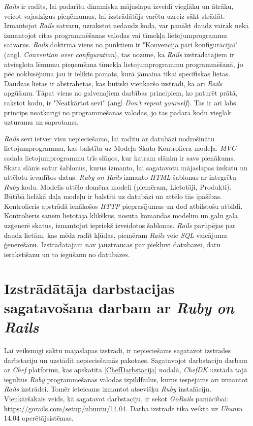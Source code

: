 \textit{Rails} ir radīts, lai padarītu dinamisku mājaslapu izveidi vieglāku un ātrāku, veicot vajadzīgus pieņēmumus, lai izstrādātājs varētu uzreiz sākt strādāt. Izmantojot \textit{Rails} satvaru, uzrakstot nedaudz koda, var panākt daudz vairāk nekā izmantojot citas programmēšanas valodas vai tīmekļa lietojumprogrammu satvarus. \textit{Rails} doktrīnā viens no punktiem ir "Konvencija pāri konfigurācijai" (angl. \textit{Convention over configuration}), tas nozīmē, ka \textit{Rails} izstrādātājiem ir atvieglota lēmumu pieņemšana tīmekļa lietojumprogrammu programmēšanā, jo pēc noklusējuma jau ir ielikts pamats, kurā jāmaina tikai specifiskas lietas. Daudzas lietas ir abstrahētas, kas būtiski vienkāršo izstrādi, kā arī \textit{Rails} apgūšanu. Tāpat viens no galvenajiem darbības principiem, ko paturēt prātā, rakstot kodu, ir "Neatkārtot sevi" (angl \textit{Don't repeat yourself}). Tas ir arī labs princips neatkarīgi no programmēšanas valodas, jo tas padara kodu vieglāk uzturamu un saprotamu.
\cite{hartlRails} \cite{rails-guides}

\textit{Rails} sevī ietver visu nepieciešamo, lai radītu ar datubāzi nodrošinātu lietojumprogrammu, kas balstīta uz Modeļa-Skata-Kontroliera  modeļa.
\textit{MVC} sadala lietojumprogrammu trīs slāņos, kur katram slānim ir savs pienākums.
Skata slānis satur šablonus, kurus izmanto, lai sagatavotu mājaslapas izskatu un attēlotu ievadītos datus. \textit{Ruby on Rails} izmanto \textit{HTML} šablonus ar integrētu \textit{Ruby} kodu.
Modelis attēlo domēna modeli (piemēram, Lietotāji, Produkti). Būtībā lielākā daļa modeļu ir balstīti uz datubāzi un attēlo tās īpašības.
Kontrolieris apstrādā ienākošos \textit{HTTP} pieprasījumus un dod atbilstošu atbildi. Kontrolieris saņem lietotāja klikšķus, nosūta komandas modelim un galu galā uzģenerē skatus, izmantojot iepriekš izveidotos šablonus.
\cite{rails-api}
\textit{Rails} parūpējas par daudz lietām, kas mēdz radīt kļūdas, piemēram \textit{Rails} veic \textit{SQL} vaicājumu ģenerēšanu. Izstrādātājam nav jāuztraucas par piekļuvi datubāzei, datu ierakstīšanu un to iegūšanu no datubāzes.

\section{Izstrādātāja darbstacijas sagatavošana darbam ar \textit{Ruby on Rails}} \label{RubyDarbstacija}
Lai veiksmīgi sāktu mājaslapas izstrādi, ir nepieciešams sagatavot izstrādes darbstaciju un uzstādīt nepieciešamās pakotnes. Sagatavojot darbstaciju darbam ar \textit{Chef} platformu, kas apskatīta \ref{ChefDarbstacija} nodaļā, \textit{ChefDK} uzstāda tajā iegultus \textit{Ruby} programmēšanas valodas izpildfailus, kurus iespējams arī izmantot \textit{Rails} izstrādei. Tomēr ieteicams izmantot atsevišķu \textit{Ruby} instalāciju. Vienkāršākais veids, kā sagatavot darbstaciju, ir sekot \textit{GoRails} pamācībai: \url{https://gorails.com/setup/ubuntu/14.04}. Darba izstrāde tika veikta uz \textit{Ubuntu} 14.04 operētājsistēmas.


